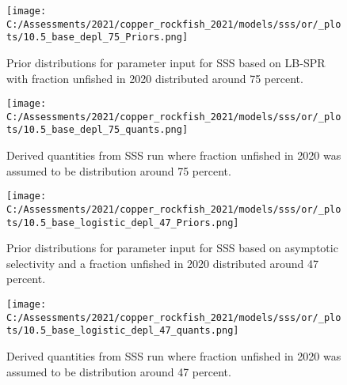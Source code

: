 \documentclass[11pt,
  english,
  a4paper,
]{article}
\begin{document}
\begin{figure}
\centering
\texttt{[image: C:/Assessments/2021/copper\_rockfish\_2021/models/sss/or/\_plots/10.5\_base\_depl\_75\_Priors.png]}
\caption{Prior distributions for parameter input for SSS based on LB-SPR with fraction unfished in 2020 distributed around 75 percent.\label{fig:sss-prior-75}}
\end{figure}

\tagmcend\tagstructend

\newpage


\begin{figure}
\centering
\texttt{[image: C:/Assessments/2021/copper\_rockfish\_2021/models/sss/or/\_plots/10.5\_base\_depl\_75\_quants.png]}
\caption{Derived quantities from SSS run where fraction unfished in 2020 was assumed to be distribution around 75 percent.\label{fig:sss-quant-75}}
\end{figure}

\tagmcend\tagstructend

\newpage


\begin{figure}
\centering
\texttt{[image: C:/Assessments/2021/copper\_rockfish\_2021/models/sss/or/\_plots/10.5\_base\_logistic\_depl\_47\_Priors.png]}
\caption{Prior distributions for parameter input for SSS based on asymptotic selectivity and a fraction unfished in 2020 distributed around 47 percent.\label{fig:sss-prior-47}}
\end{figure}

\tagmcend\tagstructend

\newpage


\begin{figure}
\centering
\texttt{[image: C:/Assessments/2021/copper\_rockfish\_2021/models/sss/or/\_plots/10.5\_base\_logistic\_depl\_47\_quants.png]}
\caption{Derived quantities from SSS run where fraction unfished in 2020 was assumed to be distribution around 47 percent.\label{fig:sss-quant-47}}
\end{figure}
\end{document}
